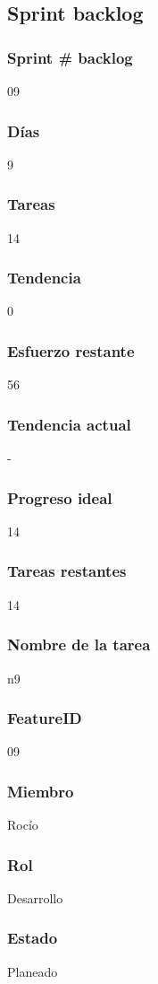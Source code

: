 \subsection{Sprint backlog}
\subsubsection{Sprint # backlog}
09
\subsubsection{Días}
9
\subsubsection{Tareas}
14
\subsubsection{Tendencia}
0
\subsubsection{Esfuerzo restante}
56
\subsubsection{Tendencia actual}
-
\subsubsection{Progreso ideal}
14
\subsubsection{Tareas restantes}
14
\subsubsection{Nombre de la tarea}
n9
\subsubsection{FeatureID}
09
\subsubsection{Miembro}
Rocío
\subsubsection{Rol}
Desarrollo
\subsubsection{Estado}
Planeado

